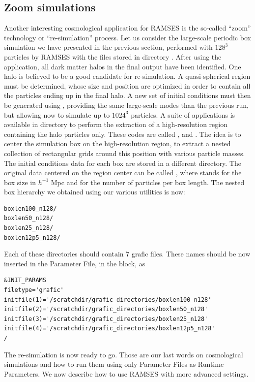 \subsection{Zoom simulations}

Another interesting cosmological application for RAMSES is the so-called
``zoom'' technology or ``re-simulation'' process. Let us consider the
large-scale periodic box simulation we have presented in the previous
section, performed with $128^3$ particles by RAMSES with the
 files stored in directory .
After using the  application, all dark matter halos in the
final output have been identified. One halo is believed to be a good
candidate for re-simulation. A quasi-spherical region must be
determined, whose size and position are optimized in order to contain
all the particles ending up in the final halo. A new set of initial
conditions must then be generated using , providing the
same large-scale modes than the previous run, but allowing now to
simulate up to $1024^3$ particles.
A suite of applications is available in directory  to
perform the extraction of a high-resolution region containing the halo
particles only. These codes are called ,
 and . The idea is to center
the simulation box on the high-resolution region, to extract a nested
collection of rectangular grids around this position with various
particle masses.  The initial conditions data for each box are stored in
a different directory. The original data centered on the region center
can be called , where  stands for the box
size in $h^{-1}$ Mpc and  for the number of particles per box
length. The nested box hierarchy we obtained using our various utilities
is now:
%
\begin{Verbatim}
boxlen100_n128/
boxlen50_n128/
boxlen25_n128/
boxlen12p5_n128/
\end{Verbatim}
%
Each of these directories should contain 7 grafic files. These names
should be now inserted in the Parameter File, in the
 block, as
%
\begin{Verbatim}
&INIT_PARAMS
filetype='grafic'
initfile(1)='/scratchdir/grafic_directories/boxlen100_n128'
initfile(2)='/scratchdir/grafic_directories/boxlen50_n128'
initfile(3)='/scratchdir/grafic_directories/boxlen25_n128'
initfile(4)='/scratchdir/grafic_directories/boxlen12p5_n128'
/
\end{Verbatim}
%
The re-simulation is now ready to go. Those are our last words on
cosmological simulations and how to run them using only Parameter Files
as Runtime Parameters. We now describe how to use RAMSES with more
advanced settings.

